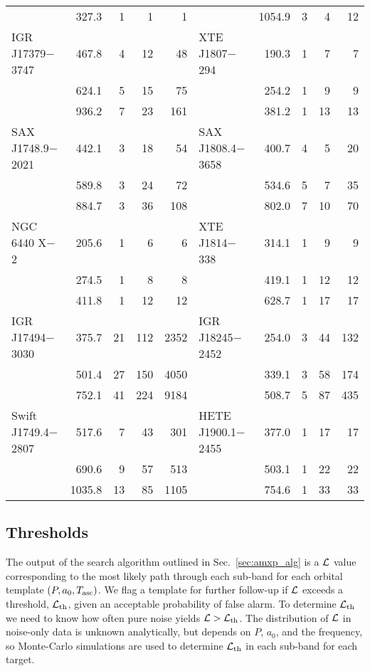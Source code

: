 \begin{landscape}
\begin{table}
{\begin{NiceTabular}{l d{3} d{1.5} d{1.5} d{1.5} l d{3} d{1.5} d{1.5} d{1.5}}
		 				& 327.3 & 1 & 1 & 1 			& 						& 1054.9 & 3 & 4 & 12 			\\
IGR J17379$-$3747 	 	& 467.8 & 4 & 12 & 48 			& XTE J1807$-$294 		& 190.3 & 1 & 7 & 7 			\\
						& 624.1 & 5 & 15 & 75 			&     				   	& 254.2 & 1 & 9 & 9 			\\
						& 936.2 & 7 & 23 & 161 			&     				   	& 381.2 & 1 & 13 & 13 			\\
SAX J1748.9$-$2021 		& 442.1 & 3 & 18 & 54 			& SAX J1808.4$-$3658 	& 400.7 & 4 & 5 & 20 			\\
						& 589.8 & 3 & 24 & 72 			&     					& 534.6 & 5 & 7 & 35 			\\
						& 884.7 & 3 & 36 & 108 			&     					& 802.0 & 7 & 10 & 70 			\\
NGC 6440 X$-$2 	 		& 205.6 & 1 & 6 & 6 			& XTE J1814$-$338 		& 314.1 & 1 & 9 & 9 			\\
       				  	& 274.5 & 1 & 8 & 8 			&     				    & 419.1 & 1 & 12 & 12 		    \\
       				 	& 411.8 & 1 & 12 & 12 			&     				   	& 628.7 & 1 & 17 & 17 			\\
IGR J17494$-$3030 	 	& 375.7 & 21 & 112 & 2352 		& IGR J18245$-$2452 	& 254.0 & 3 & 44 & 132 			\\
						& 501.4 & 27 & 150 & 4050 		& 						& 339.1 & 3 & 58 & 174 			\\
						& 752.1 & 41 & 224 & 9184 		& 						& 508.7 & 5 & 87 & 435 			\\
Swift J1749.4$-$2807 	& 517.6 & 7 & 43 & 301 			& HETE J1900.1$-$2455 	& 377.0 & 1 & 17 & 17 			\\
						& 690.6 & 9 & 57 & 513 			& 		 				& 503.1 & 1 & 22 & 22 			\\
						& 1035.8 & 13 & 85 & 1105 		& 		 	   			& 754.6 & 1 & 33 & 33 			\\
\bottomrule
\end{NiceTabular}
}
\end{table}
\end{landscape}

\subsection{Thresholds \label{sec:amxp_thresh}}
The output of the search algorithm outlined in Sec.~\ref{sec:amxp_alg} is a $\mathcal{L}$ value corresponding to the most likely path through each sub-band for each orbital template $(P, a_0, T_{\textrm{asc}})$. We flag a template for further follow-up if $\mathcal{L}$ exceeds a threshold, $\mathcal{L}_{\rm th}$, given an acceptable probability of false alarm. To determine $\mathcal{L}_{\rm th}$ we need to know how often pure noise yields $\mathcal{L}> \mathcal{L}_{\rm th}$. The distribution of $\mathcal{L}$ in noise-only data is unknown analytically, but depends on $P$, $a_0$, and the frequency, so Monte-Carlo simulations are used to determine $\mathcal{L}_{\rm th}$ in each sub-band for each target.

